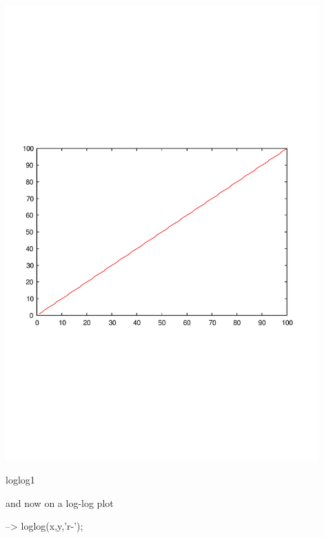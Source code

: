  
\begin{DoxyImage}
\includegraphics[width=12cm]{loglog1}
\caption{loglog1}
\end{DoxyImage}
 and now on a log-\/log plot


\begin{DoxyVerbInclude}
--> loglog(x,y,'r-');
\end{DoxyVerbInclude}


